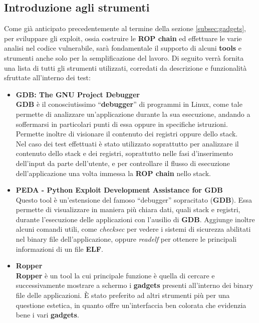 \subsection*{Introduzione agli strumenti}
\label{subsec:Tools}
Come già anticipato precedentemente al termine della sezione \ref{subsec:gadgets}, per sviluppare gli exploit, ossia costruire le \textbf{ROP chain} ed effettuare le varie analisi nel codice vulnerabile, sarà fondamentale il supporto di alcuni \textbf{tools} e strumenti anche solo per la semplificazione del lavoro.
Di seguito verrà fornita una lista di tutti gli strumenti utilizzati, corredati da descrizione e funzionalità sfruttate all'interno dei test:
\begin{itemize}
        \item \label{GDB}\textbf{GDB: The GNU Project Debugger} \cite*{GDB}\\
              \textbf{GDB} è il conosciutissimo ``\textbf{debugger}'' di programmi in Linux, come tale permette di analizzare un'applicazione durante la sua esecuzione, andando a soffermarsi in particolari punti di essa oppure in specifiche istruzioni. Permette inoltre di visionare il contenuto dei registri oppure dello stack.\\
              Nel caso dei test effettuati è stato utilizzato soprattutto per analizzare il contenuto dello stack e dei registri, soprattutto nelle fasi d'inserimento dell'input da parte dell'utente, e per controllare il flusso di esecuzione dell'applicazione una volta immessa la \textbf{ROP chain} nello stack.
        \item \label{PEDA}\textbf{PEDA - Python Exploit Development Assistance for GDB} \cite*{PEDA}\\ 
              Questo tool è un'estensione del famoso ``debugger'' sopracitato (\textbf{GDB}). Essa permette di visualizzare in maniera più chiara dati, quali stack e registri, durante l'esecuzione delle applicazioni con l'ausilio di \textbf{GDB}. Aggiunge inoltre alcuni comandi utili, come \textit{checksec} per vedere i sistemi di sicurezza abilitati nel
              binary file dell'applicazione, oppure \textit{readelf} per ottenere le principali informazioni di un file \textbf{ELF}.
        \item \label{Ropper}\textbf{Ropper} \cite*{Ropper}\\
              \textbf{Ropper} è un tool la cui principale funzione è quella di cercare e successivamente mostrare a schermo i \textbf{gadgets} presenti all'interno dei binary file delle applicazioni. È stato preferito ad altri strumenti più per una questione estetica, in quanto offre un'interfaccia ben colorata che evidenzia bene i vari \textbf{gadgets}.

\end{itemize}
